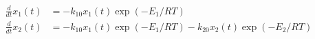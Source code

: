 \begin{equation}
  \begin{aligned}
    \frac{d}{dt}x_{1}(t) & = - k_{10} x_1(t) \exp(-E_1 / RT)
    \\
    \frac{d}{dt}x_{2}(t) & = - k_{10} x_1(t) \exp(-E_1 / RT) - k_{20} x_2(t) \exp(-E_2 / RT)
  \end{aligned}
  \label{eq:batch_reactor01_2}
\end{equation}
